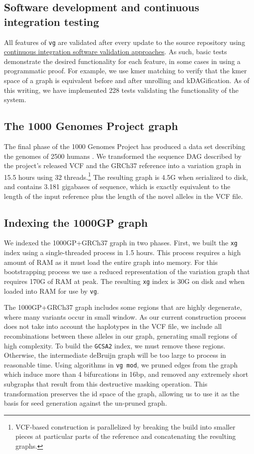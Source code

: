 \documentclass[12pt]{article}
\begin{document}
\subsection{Software development and continuous integration testing}

All features of {\tt vg} are validated after every update to the source repository using \href{https://travis-ci.org/vgteam/vg}{continuous integration software validation approaches}.
As such, basic tests demonstrate the desired functionality for each feature, in some cases in using a programmatic proof.
For example, we use kmer matching to verify that the kmer space of a graph is equivalent before and after unrolling and kDAGification.
As of this writing, we have implemented 228 tests validating the functionality of the system.

\subsection{The 1000 Genomes Project graph}
\label{sec:1000g}

The final phase of the 1000 Genomes Project has produced a data set describing the genomes of 2500 humans \cite{1000g2015}.
We transformed the sequence DAG described by the project's released VCF and the GRCh37 reference into a variation graph in 15.5 hours using 32 threads.\footnote{VCF-based construction is parallelized by breaking the build into smaller pieces at particular parts of the reference and concatenating the resulting graphs.}
The resulting graph is 4.5G when serialized to disk, and contains 3.181 gigabases of sequence, which is exactly equivalent to the length of the input reference plus the length of the novel alleles in the VCF file.

\subsection{Indexing the 1000GP graph}

We indexed the 1000GP+GRCh37 graph in two phases.
First, we built the {\tt xg} index using a single-threaded process in 1.5 hours.
This process requires a high amount of RAM as it must load the entire graph into memory. For this bootstrapping process we use a reduced representation of the variation graph that requires 170G of RAM at peak.
The resulting {\tt xg} index is 30G on disk and when loaded into RAM for use by {\tt vg}.

The 1000GP+GRCh37 graph includes some regions that are highly degenerate, where many variants occur in small window.
As our current construction process does not take into account the haplotypes in the VCF file, we include all recombinations between these alleles in our graph, generating small regions of high complexity.
To build the {\tt GCSA2} index, we must remove these regions. Otherwise, the intermediate deBruijn graph will be too large to process in reasonable time.
Using algorithms in {\tt vg mod}, we pruned edges from the graph which induce more than 4 bifurcations in 16bp, and removed any extremely short subgraphs that result from this destructive masking operation.
This transformation preserves the id space of the graph, allowing us to use it as the basis for seed generation against the un-pruned graph.
\end{document}
